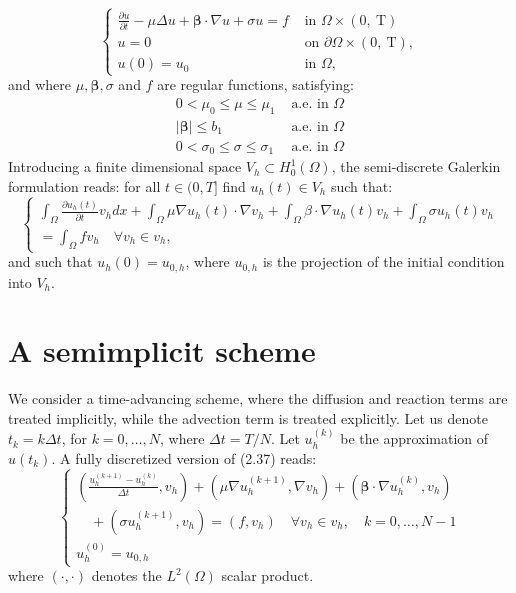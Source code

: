 \documentclass[11pt]{book}
\begin{document}
\begin{equation}
\begin{cases}\frac{\partial u}{\partial t}-\mu \Delta u+\boldsymbol{\beta} \cdot \nabla u+\sigma u=f & \text { in } \Omega \times(0, \mathrm{~T}) \\ u=0 & \text { on } \partial \Omega \times(0, \mathrm{~T}), \\ u(0)=u_{0} & \text { in } \Omega,\end{cases}
\end{equation}
and where $\mu, \boldsymbol{\beta}, \sigma$ and $f$ are regular functions, satisfying:$$
\begin{array}{ll}
0<\mu_{0} \leq \mu \leq \mu_{1} & \text { a.e. in } \Omega \\
|\boldsymbol{\beta}| \leq b_{1} & \text { a.e. in } \Omega \\
0<\sigma_{0} \leq \sigma \leq \sigma_{1} & \text { a.e. in } \Omega
\end{array}$$
Introducing a finite dimensional space $V_{h} \subset H_{0}^{1}(\Omega)$, the semi-discrete Galerkin formulation reads: for all $t \in(0, T]$ find $u_{h}(t) \in V_{h}$ such that:
\begin{equation}
\left\{\begin{array}{c}
\int_{\Omega} \frac{\partial u_{h}(t)}{\partial t} v_{h} d x+\int_{\Omega} \mu \nabla u_{h}(t) \cdot \nabla v_{h}+\int_{\Omega} \beta \cdot \nabla u_{h}(t) v_{h}+\int_{\Omega} \sigma u_{h}(t) v_{h} \\
=\int_{\Omega} f v_{h} \quad \forall v_{h} \in v_{h},
\end{array}\right.
\end{equation}
and such that $u_{h}(0)=u_{0, h}$, where $u_{0, h}$ is the projection of the initial condition into $V_{h}$.

\section{A semimplicit scheme}
We consider a time-advancing scheme, where the diffusion and reaction terms are treated implicitly, while the advection term is treated explicitly. Let us denote $t_{k}=k \Delta t$, for $k=0, \ldots, N$, where $\Delta t=T / N$. Let $u_{h}^{(k)}$ be the approximation of $u\left(t_{k}\right)$. A fully discretized version of (2.37) reads:
\begin{equation}
\left\{\begin{array}{l}
\left(\frac{u_{h}^{(k+1)}-u_{h}^{(k)}}{\Delta t}, v_{h}\right)+\left(\mu \nabla u_{h}^{(k+1)}, \nabla v_{h}\right)+\left(\boldsymbol{\beta} \cdot \nabla u_{h}^{(k)}, v_{h}\right) \\
\quad+\left(\sigma u_{h}^{(k+1)}, v_{h}\right)=\left(f, v_{h}\right) \quad \forall v_{h} \in v_{h}, \quad k=0, \ldots, N-1 \\
u_{h}^{(0)}=u_{0, h}
\end{array}\right.
\end{equation}
where $(\cdot, \cdot)$ denotes the $L^{2}(\Omega)$ scalar product.
\end{document}
